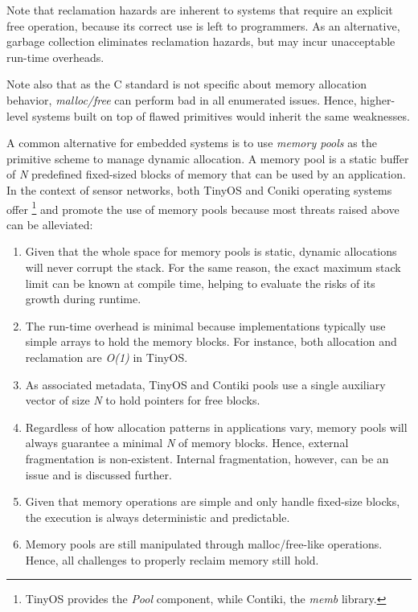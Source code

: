 \documentclass{llncs}
\begin{document}
Note that reclamation hazards are inherent to systems that require an explicit 
free operation, because its correct use is left to programmers.
As an alternative, garbage collection eliminates reclamation hazards, but may 
incur unacceptable run-time overheads.

Note also that as the C standard is not specific about memory allocation 
behavior, \emph{malloc/free} can perform bad in all enumerated issues.
%
Hence, higher-level systems built on top of flawed primitives would inherit the 
same weaknesses.

A common alternative for embedded systems is to use \emph{memory pools} as the 
primitive scheme to manage dynamic allocation.
A memory pool is a static buffer of \emph{N} predefined fixed-sized blocks of 
memory that can be used by an application.
%
In the context of sensor networks, both TinyOS and Coniki operating systems 
offer%
\footnote{
TinyOS provides the \emph{Pool} component, while Contiki, the \emph{memb} 
library.
}
and promote the use of memory pools because most threats raised above can be 
alleviated:

\begin{enumerate}
\item
Given that the whole space for memory pools is static, dynamic allocations will 
never corrupt the stack.
For the same reason, the exact maximum stack limit can be known at compile 
time, helping to evaluate the risks of its growth during runtime.

\item
The run-time overhead is minimal because implementations typically use simple 
arrays to hold the memory blocks.
For instance, both allocation and reclamation are \emph{O(1)} in TinyOS.

\item
As associated metadata, TinyOS and Contiki pools use a single auxiliary vector 
of size \emph{N} to hold pointers for free blocks.

\item
Regardless of how allocation patterns in applications vary, memory pools will 
always guarantee a minimal \emph{N} of memory blocks.
Hence, external fragmentation is non-existent.
Internal fragmentation, however, can be an issue and is discussed further.

\item
Given that memory operations are simple and only handle fixed-size blocks, the 
execution is always deterministic and predictable.

\item
Memory pools are still manipulated through malloc/free-like operations.
Hence, all challenges to properly reclaim memory still hold.
\end{enumerate}
\end{document}
